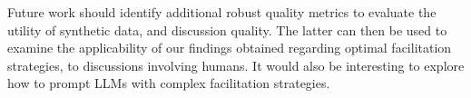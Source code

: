 %

Future work should identify additional robust quality metrics to evaluate the utility of synthetic data, and discussion quality. The latter can then be used to examine the applicability of our findings obtained regarding optimal facilitation strategies, to discussions involving humans. It would also be interesting to explore how to prompt \acp{LLM} with complex facilitation strategies.